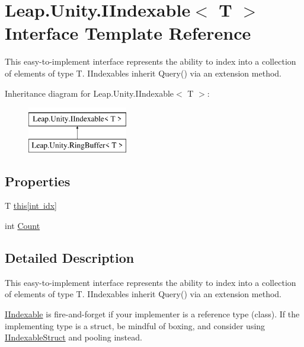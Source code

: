 \hypertarget{interface_leap_1_1_unity_1_1_i_indexable}{}\section{Leap.\+Unity.\+I\+Indexable$<$ T $>$ Interface Template Reference}
\label{interface_leap_1_1_unity_1_1_i_indexable}


This easy-\/to-\/implement interface represents the ability to index into a collection of elements of type T. I\+Indexables inherit Query() via an extension method.  


Inheritance diagram for Leap.\+Unity.\+I\+Indexable$<$ T $>$\+:\begin{figure}[H]
\begin{center}
\leavevmode
\includegraphics[height=2.000000cm]{interface_leap_1_1_unity_1_1_i_indexable}
\end{center}
\end{figure}
\subsection*{Properties}
\begin{DoxyCompactItemize}
\item 
T \mbox{\hyperlink{interface_leap_1_1_unity_1_1_i_indexable_a91008796a5e0ea8200a6f4fa226e1a50}{this\mbox{[}int idx\mbox{]}}}
\item 
int \mbox{\hyperlink{interface_leap_1_1_unity_1_1_i_indexable_a1f881d4965a67f3d717770fb6e546624}{Count}}
\end{DoxyCompactItemize}


\subsection{Detailed Description}
This easy-\/to-\/implement interface represents the ability to index into a collection of elements of type T. I\+Indexables inherit Query() via an extension method. 

\mbox{\hyperlink{interface_leap_1_1_unity_1_1_i_indexable}{I\+Indexable}} is fire-\/and-\/forget if your implementer is a reference type (class). If the implementing type is a struct, be mindful of boxing, and consider using \mbox{\hyperlink{interface_leap_1_1_unity_1_1_i_indexable_struct}{I\+Indexable\+Struct}} and pooling instead. 

